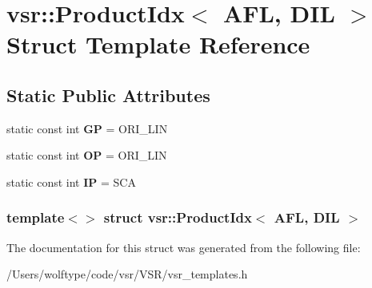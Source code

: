 \hypertarget{structvsr_1_1_product_idx_3_01_a_f_l_00_01_d_i_l_01_4}{\section{vsr\-:\-:Product\-Idx$<$ A\-F\-L, D\-I\-L $>$ Struct Template Reference}
\label{structvsr_1_1_product_idx_3_01_a_f_l_00_01_d_i_l_01_4}
}
\subsection*{Static Public Attributes}
\begin{DoxyCompactItemize}
\item 
\hypertarget{structvsr_1_1_product_idx_3_01_a_f_l_00_01_d_i_l_01_4_a295a90fde4c1c25865130bd1e7e50b58}{static const int {\bfseries G\-P} = O\-R\-I\-\_\-\-L\-I\-N}\label{structvsr_1_1_product_idx_3_01_a_f_l_00_01_d_i_l_01_4_a295a90fde4c1c25865130bd1e7e50b58}

\item 
\hypertarget{structvsr_1_1_product_idx_3_01_a_f_l_00_01_d_i_l_01_4_a43f62770ad3b6a27f2c0559f875530b2}{static const int {\bfseries O\-P} = O\-R\-I\-\_\-\-L\-I\-N}\label{structvsr_1_1_product_idx_3_01_a_f_l_00_01_d_i_l_01_4_a43f62770ad3b6a27f2c0559f875530b2}

\item 
\hypertarget{structvsr_1_1_product_idx_3_01_a_f_l_00_01_d_i_l_01_4_ac3e74e4e2ac61cc658f4d36e6346d448}{static const int {\bfseries I\-P} = S\-C\-A}\label{structvsr_1_1_product_idx_3_01_a_f_l_00_01_d_i_l_01_4_ac3e74e4e2ac61cc658f4d36e6346d448}

\end{DoxyCompactItemize}
\subsubsection*{template$<$$>$ struct vsr\-::\-Product\-Idx$<$ A\-F\-L, D\-I\-L $>$}



The documentation for this struct was generated from the following file\-:\begin{DoxyCompactItemize}
\item 
/\-Users/wolftype/code/vsr/\-V\-S\-R/vsr\-\_\-templates.\-h\end{DoxyCompactItemize}
